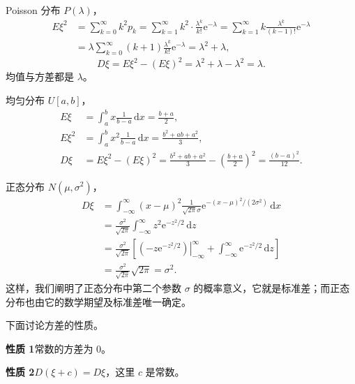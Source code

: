 \documentclass[../../main.tex]{subfiles}
\begin{document}
\begin{example}\label{example:ch04-方差-Poisson}
Poisson 分布 $P(\lambda)$，
\begin{align*}
E\xi^2&=\sum_{k=0}^{\infty}k^2 p_k=\sum_{k=1}^{\infty}k^2\cdot\frac{\lambda^k}{k!}\mathrm{e}^{-\lambda}
=\sum_{k=1}^{\infty}k\frac{\lambda^k}{(k-1)!}\mathrm{e}^{-\lambda}\\
&=\lambda\sum_{k=0}^{\infty}(k+1)\frac{\lambda^k}{k!}\mathrm{e}^{-\lambda}=\lambda^2+\lambda,
\end{align*}
\[
D\xi=E\xi^2-(E\xi)^2=\lambda^2+\lambda-\lambda^2=\lambda.
\]
均值与方差都是 $\lambda$。
\end{example}

\begin{example}[均匀分布的方差]\label{example:ch04-方差-均匀}
均匀分布 $U[a,b]$，
\begin{align*}
E\xi&=\int_a^b x\frac{1}{b-a}\,\mathrm{d}x=\frac{b+a}{2},\\
E\xi^2&=\int_a^b x^2\frac{1}{b-a}\,\mathrm{d}x=\frac{b^2+ab+a^2}{3},\\
D\xi&=E\xi^2-(E\xi)^2=\frac{b^2+ab+a^2}{3}-\left(\frac{b+a}{2}\right)^2=\frac{(b-a)^2}{12}.
\end{align*}
\end{example}

\begin{example}[正态分布的方差]\label{example:ch04-方差-正态}
正态分布 $N(\mu,\sigma^2)$，
\begin{align*}
D\xi&=\int_{-\infty}^{\infty}(x-\mu)^2\frac{1}{\sqrt{2\pi}\sigma}\mathrm{e}^{-(x-\mu)^2/(2\sigma^2)}\,\mathrm{d}x\\
&=\frac{\sigma^2}{\sqrt{2\pi}}\int_{-\infty}^{\infty}z^2\mathrm{e}^{-z^2/2}\,\mathrm{d}z\\
&=\frac{\sigma^2}{\sqrt{2\pi}}\left[\left.\left(-z\mathrm{e}^{-z^2/2}\right)\right|_{-\infty}^{\infty}+\int_{-\infty}^{\infty}\mathrm{e}^{-z^2/2}\,\mathrm{d}z\right]\\
&=\frac{\sigma^2}{\sqrt{2\pi}}\sqrt{2\pi}=\sigma^2.
\end{align*}
这样，我们阐明了正态分布中第二个参数 $\sigma$ 的概率意义，它就是标准差；而正态分布也由它的数学期望及标准差唯一确定。
\end{example}

下面讨论方差的性质。

\noindent\textbf{性质 1}\quad 常数的方差为 $0$。

\noindent\textbf{性质 2}\quad $D(\xi+c)=D\xi$，这里 $c$ 是常数。
\end{document}
